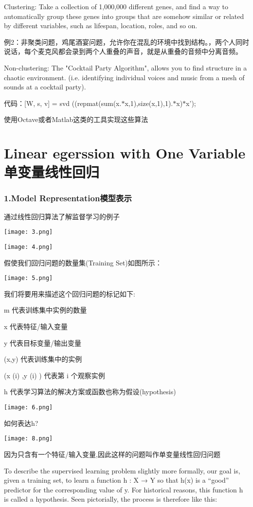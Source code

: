 \documentclass{article}
\begin{document}
\begin{CJK}{UTF8}{gbsn}
Clustering: Take a collection of 1,000,000 different genes, and find a way to automatically group these genes into groups that are somehow similar or related by different variables, such as lifespan, location, roles, and so on.
\subparagraph*{}
例2：非聚类问题，鸡尾酒宴问题，允许你在混乱的环境中找到结构。，两个人同时说话，每个麦克风都会录到两个人重叠的声音，就是从重叠的音频中分离音频。

Non-clustering: The "Cocktail Party Algorithm", allows you to find structure in a chaotic environment. (i.e. identifying individual voices and music from a mesh of sounds at a cocktail party).

代码：[W, s, v] = svd ((repmat(sum(x.$*$x,1),size(x,1),1).$*$x)$*$x');
\subparagraph*{}
使用Octave或者Matlab这类的工具实现这些算法
\newpage

\part{Linear egerssion with One Variable单变量线性回归}
\section*{1.Model Representation模型表示}
通过线性回归算法了解监督学习的例子

\texttt{[image: 3.png]}

\texttt{[image: 4.png]}

假使我们回归问题的数量集(Training Set)如图所示：

\texttt{[image: 5.png]}

我们将要用来描述这个回归问题的标记如下:

m 代表训练集中实例的数量

x 代表特征/输入变量

y 代表目标变量/输出变量

(x,y) 代表训练集中的实例

(x (i) ,y (i) ) 代表第 i 个观察实例

h 代表学习算法的解决方案或函数也称为假设(hypothesis)

\texttt{[image: 6.png]}

如何表达h?

\texttt{[image: 8.png]}

因为只含有一个特征/输入变量,因此这样的问题叫作单变量线性回归问题

\subparagraph*{}
To describe the supervised learning problem slightly more formally, our goal is, given a training set, to learn a function h : X → Y so that h(x) is a “good” predictor for the corresponding value of y. For historical reasons, this function h is called a hypothesis. Seen pictorially, the process is therefore like this:


\end{CJK}
\end{document}
